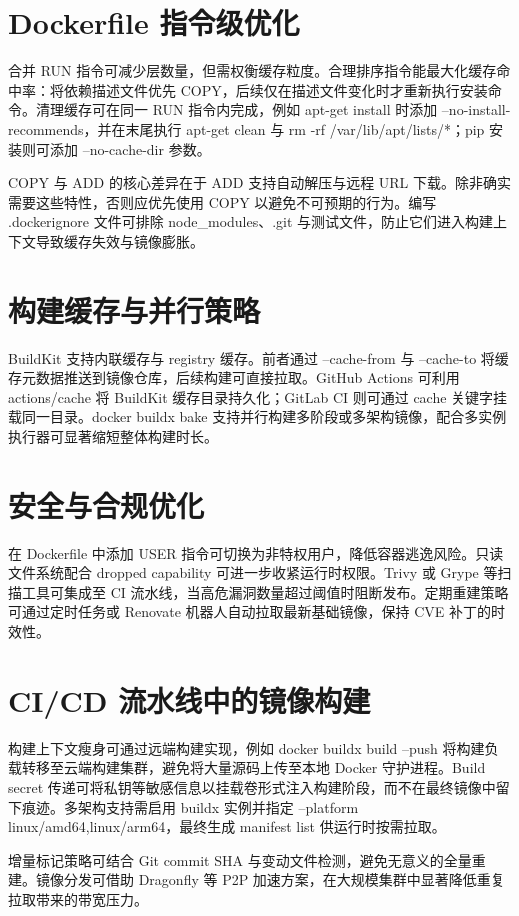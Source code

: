 \chapter{Dockerfile 指令级优化}
合并 RUN 指令可减少层数量，但需权衡缓存粒度。合理排序指令能最大化缓存命中率：将依赖描述文件优先 COPY，后续仅在描述文件变化时才重新执行安装命令。清理缓存可在同一 RUN 指令内完成，例如 apt-get install 时添加 --no-install-recommends，并在末尾执行 apt-get clean 与 rm -rf /var/lib/apt/lists/*；pip 安装则可添加 --no-cache-dir 参数。\par
COPY 与 ADD 的核心差异在于 ADD 支持自动解压与远程 URL 下载。除非确实需要这些特性，否则应优先使用 COPY 以避免不可预期的行为。编写 .dockerignore 文件可排除 node\_{}modules、.git 与测试文件，防止它们进入构建上下文导致缓存失效与镜像膨胀。\par
\chapter{构建缓存与并行策略}
BuildKit 支持内联缓存与 registry 缓存。前者通过 --cache-from 与 --cache-to 将缓存元数据推送到镜像仓库，后续构建可直接拉取。GitHub Actions 可利用 actions/cache 将 BuildKit 缓存目录持久化；GitLab CI 则可通过 cache 关键字挂载同一目录。docker buildx bake 支持并行构建多阶段或多架构镜像，配合多实例执行器可显著缩短整体构建时长。\par
\chapter{安全与合规优化}
在 Dockerfile 中添加 USER 指令可切换为非特权用户，降低容器逃逸风险。只读文件系统配合 dropped capability 可进一步收紧运行时权限。Trivy 或 Grype 等扫描工具可集成至 CI 流水线，当高危漏洞数量超过阈值时阻断发布。定期重建策略可通过定时任务或 Renovate 机器人自动拉取最新基础镜像，保持 CVE 补丁的时效性。\par
\chapter{CI/CD 流水线中的镜像构建}
构建上下文瘦身可通过远端构建实现，例如 docker buildx build --push 将构建负载转移至云端构建集群，避免将大量源码上传至本地 Docker 守护进程。Build secret 传递可将私钥等敏感信息以挂载卷形式注入构建阶段，而不在最终镜像中留下痕迹。多架构支持需启用 buildx 实例并指定 --platform linux/amd64,linux/arm64，最终生成 manifest list 供运行时按需拉取。\par
增量标记策略可结合 Git commit SHA 与变动文件检测，避免无意义的全量重建。镜像分发可借助 Dragonfly 等 P2P 加速方案，在大规模集群中显著降低重复拉取带来的带宽压力。\par
